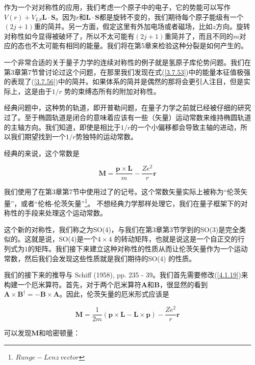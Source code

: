 \documentclass[UTF8,twoside]{ctexart}
\begin{document}
作为一个对对称性的应用，我们考虑一个原子中的电子，它的势能可以写作$V(r)+V_{LS}\bm{L \cdot S}$。因为$r$和$\bm{L\cdot S}$都是旋转不变的，我们期待每个原子能级有一个$(2j+1)$重的简并。另一方面，假定这里有外加电场或者磁场，比如$z$方向。旋转对称性如今显得被破坏了，所以不太可能有$(2j+1)$重简并了，而且不同的$m$对应的态也不太可能有相同的能量。我们将在第5章来检验这种分裂是如何产生的。\\


\noindent 一个非常合适的关于量子力学的连续对称性的例子就是氢原子库伦势问题。我们在第3章第7节曾讨论过这个问题，在那里我们发现在式({\ref{3.7.53}})中的能量本征值极强的表现了({\ref{3.7.56}})中的简并。如果体系的简并是偶然的那将会更引人注目，但是实际上，这是由于$1/r$ 势的束缚态所有的附加对称性。

经典问题中，这种势的轨道，即开普勒问题，在量子力学之前就已经被仔细的研究过了。至于椭圆轨道是闭合的意味着应该有一些（矢量）运动常数来维持椭圆轨道的主轴方向。我们知道，即使是相比于$1/r$的一个小偏移都会导致主轴的进动，所以我们期望找到一个$1/r$势独特的运动常数。

经典的来说，这个常数是

\begin{equation}  \label{4.1.19}
\bm{M} = \frac{\bm{p\times L}}{m} - \frac{Ze^2}{r}\bm r
\end{equation}

\noindent 我们使用了在第3章第7节中使用过了的记号。这个常数矢量实际上被称为“伦茨矢量”，或者“伦格-伦茨矢量”\footnote[4]{$Runge-Lenz\  vector$}。 不想经典力学那样处理它，我们在量子框架下的对称性的手段来处理这个运动常数。

这个新的对称性，我们称之为SO(4)，与我们在第3章第3节学到的SO(3)是完全类似的。这就是说，SO(4)是一个$4\times4$ 的转动矩阵，也就是说这是一个自正交的行列式为$1$的矩阵。我们接下来建立这种对称性的性质从而让伦茨矢量作为一个运动常数，然后我们会发现这些性质就是我们期待的SO(4) 的性质。

我们的接下来的推导与 Schiff (1958), pp. 235 - 39。我们首先需要修改({\ref{4.1.19}})来构建一个厄米算符。首先，对于两个厄米算符$\bm A$和$\bm B$，很显然的看到$\bm {A\times B}^{\dagger} = -\bm{B\times A}$。因此，伦茨矢量的厄米形式应该是

\begin{equation}
\bm {M} = \frac{1}{2m}\left(\bm{p\times L - L\times p}\right) - \frac{Ze^2}{r}\bm{r}
\end{equation}

\noindent 可以发现$\bm M$和哈密顿量：
\end{document}
